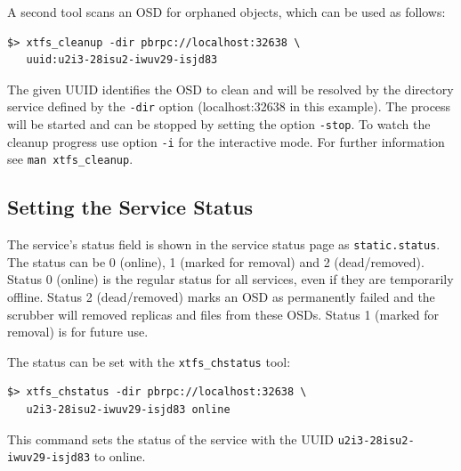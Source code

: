 \documentclass[a4paper,10pt]{book}
\begin{document}
A second tool scans an OSD for orphaned objects, which can be used as follows:

\begin{verbatim}
$> xtfs_cleanup -dir pbrpc://localhost:32638 \
   uuid:u2i3-28isu2-iwuv29-isjd83
\end{verbatim}
The given UUID identifies the OSD to clean and will be resolved by the
directory service defined by the \texttt{-dir} option (localhost:32638 in this example).
The process will be started and can be stopped by setting the option
\texttt{-stop}. To watch the cleanup progress use option \texttt{-i} for the
interactive mode. For further information see \texttt{man xtfs\_cleanup}.

\subsection{Setting the Service Status}

The service's status field is shown in the service status page as \texttt{static.status}. The status can be 0 (online), 1 (marked for removal) and 2 (dead/removed). Status 0 (online) is the regular status for all services, even if they are temporarily offline. Status 2 (dead/removed) marks an OSD as permanently failed and the scrubber will removed replicas and files from these OSDs. Status 1 (marked for removal) is for future use.

The status can be set with the \texttt{xtfs\_chstatus} tool:

\begin{verbatim}
$> xtfs_chstatus -dir pbrpc://localhost:32638 \
   u2i3-28isu2-iwuv29-isjd83 online
\end{verbatim}

This command sets the status of the service with the UUID \texttt{u2i3-28isu2-iwuv29-isjd83} to online.
\end{document}
